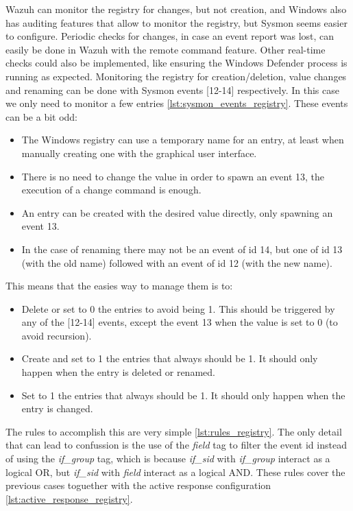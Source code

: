 \linej
Wazuh can monitor the registry for changes, but not creation, and Windows also has auditing features that allow to monitor the registry, but Sysmon seems easier to configure.
Periodic checks for changes, in case an event report was lost, can easily be done in Wazuh with the remote command feature.
Other real-time checks could also be implemented, like ensuring the Windows Defender process is running as expected.
\linej
Monitoring the registry for creation/deletion, value changes and renaming can be done with Sysmon events [12-14] respectively.
In this case we only need to monitor a few entries \ref{lst:sysmon_events_registry}.
These events can be a bit odd:
\begin{itemize}
	\item The Windows registry can use a temporary name for an entry, at least when manually creating one with the graphical user interface.
	\item There is no need to change the value in order to spawn an event 13, the execution of a change command is enough.
	\item An entry can be created with the desired value directly, only spawning an event 13.
	\item In the case of renaming there may not be an event of id 14, but one of id 13 (with the old name) followed with an event of id 12 (with the new name).
\end{itemize}
\linej
This means that the easies way to manage them is to:
\begin{itemize}
	\item Delete or set to 0 the entries to avoid being 1. This should be triggered by any of the [12-14] events, except the event 13 when the value is set to 0 (to avoid recursion).
	\item Create and set to 1 the entries that always should be 1. It should only happen when the entry is deleted or renamed.
	\item Set to 1 the entries that always should be 1. It should only happen when the entry is changed.
\end{itemize}
\linej
The rules to accomplish this are very simple \ref{lst:rules_registry}.
The only detail that can lead to confussion is the use of the \textit{field} tag to filter the event id instead of using the \textit{if\_group} tag, which is because \textit{if\_sid} with \textit{if\_group} interact as a logical OR, but \textit{if\_sid} with \textit{field} interact as a logical AND.
\linej
These rules cover the previous cases toguether with the active response configuration \ref{lst:active_response_registry}.
